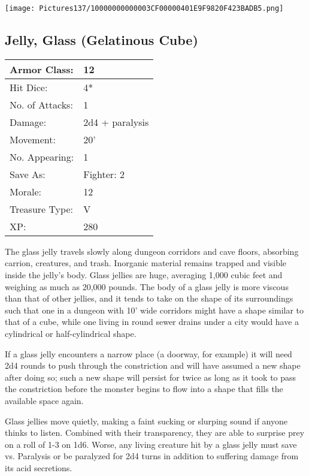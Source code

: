 \documentclass[a4paper,twoside,openany,10pt]{book}
\begin{document}
\begin{multicols}{2}
\begin{center} \texttt{[image: Pictures137/10000000000003CF00000401E9F9820F423BADB5.png]} \end{center}

\subsection*{Jelly, Glass (Gelatinous Cube)}\label{jelly-glass-gelatinous-cube}

\begin{tabularx}{0.50\textwidth}{@{}lX@{}}
Armor Class: & 12 \\\hline
Hit Dice: & 4* \\\hline
No. of Attacks: & 1 \\\hline
Damage: & 2d4 + paralysis \\\hline
Movement: & 20' \\\hline
No. Appearing: & 1 \\\hline
Save As: & Fighter: 2 \\\hline
Morale: & 12 \\\hline
Treasure Type: & V \\\hline
XP: & 280 \\\hline
\end{tabularx}

The
glass jelly travels slowly along dungeon corridors and cave floors, absorbing carrion, creatures, and trash. Inorganic material remains trapped and visible inside the jelly's body. Glass jellies are huge, averaging 1,000 cubic feet and weighing as much as 20,000 pounds. The body of a glass jelly is more viscous than that of other jellies, and it tends to take on the shape of its surroundings such that one in a dungeon with 10' wide corridors might have a shape similar to that of a cube, while one living in round sewer drains under a city would have a cylindrical or half-cylindrical shape.

If a glass jelly encounters a narrow place (a doorway, for example) it will need 2d4 rounds to push through the constriction and will have assumed a new shape after doing so; such a new shape will persist for twice as long as it took to pass the constriction before the monster begins to flow into a shape that fills the available space again. 

Glass jellies move quietly, making a faint sucking or slurping sound if anyone thinks to listen. Combined with their transparency, they are able to surprise prey on a roll of 1-3 on 1d6. Worse, any living creature hit by a glass jelly must save vs. Paralysis or be paralyzed for 2d4 turns in addition to suffering damage from its acid secretions.


\end{multicols}
\end{document}
